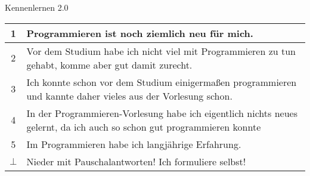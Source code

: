 


\morescalingdelimiters



	
	\section{}
	\aboutMeFrame
	
	\begin{frame}{Kennenlernen 2.0}
		\begin{tabular}{ | c | p{10.5cm} | }
			\hline
			1 & Programmieren ist noch ziemlich neu für mich. 
			\\ \hline
			2 & Vor dem Studium habe ich nicht viel mit Programmieren zu tun gehabt, komme aber gut damit zurecht.
			\\ \hline
			3 & Ich konnte schon vor dem Studium einigermaßen programmieren und kannte daher vieles aus der Vorlesung schon.
			\\ \hline
			4 & In der Programmieren-Vorlesung habe ich eigentlich nichts neues gelernt, da ich auch so schon gut programmieren konnte
			\\ \hline
			5 & Im Programmieren habe ich langjährige Erfahrung.
			\\ \hline
			$\bot$ & Nieder mit Pauschalantworten! Ich formuliere selbst!
			\\ \hline
		\end{tabular}
	\end{frame}
	
	

